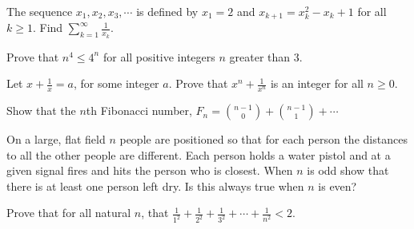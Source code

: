 \begin{prob}  The sequence $x_1, x_2, x_3, \cdots$ is defined by $x_1=2$ and $x_{k+1}=x_k^2-x_k+1$ for all $k\ge 1$.  Find $\displaystyle \sum_{k=1}^{\infty} \frac{1}{x_k}$.  \end{prob}  
\begin{prob}  Prove that $n^4\le 4^n$ for all positive integers $n$ greater than $3$.  \end{prob}  
\begin{prob}  Let $x+\frac{1}{x}=a$, for some integer $a$.  Prove that $x^n+\frac{1}{x^n}$ is an integer for all $n\ge 0$.  \end{prob}  
\begin{prob}  Show that the $n$th Fibonacci number, $F_n=\binom{n-1}{0}+\binom{n-1}{1}+\cdots$ \end{prob}
\begin{prob}  On a large, flat field $n$ people are positioned so that for each person the distances to all the other people are different.  Each person holds a water pistol and at a given signal fires and hits the person who is closest.  When $n$ is odd show that there is at least one person left dry.  Is this always true when $n$ is even?  \end{prob}
\begin{prob}  Prove that for all natural $n$, that $\frac{1}{1^2}+\frac{1}{2^2}+\frac{1}{3^2}+\cdots+\frac{1}{n^2}<2$.  \end{prob}  



